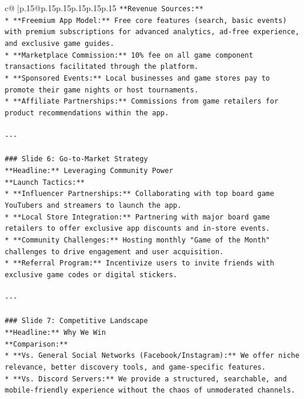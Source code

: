\documentclass{article}
\begin{document}
{\begin{supertabular}{c@{$\;$}|p{.15\linewidth}@{}p{.15\linewidth}p{.15\linewidth}p{.15\linewidth}p{.15\linewidth}p{.15\linewidth}}
{{{\texttt{**Revenue Sources:**} \\
\texttt{*   **Freemium App Model:** Free core features (search, basic events) with premium subscriptions for advanced analytics, ad{-}free experience, and exclusive game guides.} \\
\texttt{*   **Marketplace Commission:** 10\% fee on all game component transactions facilitated through the platform.} \\
\texttt{*   **Sponsored Events:** Local businesses and game stores pay to promote their game nights or host tournaments.} \\
\texttt{*   **Affiliate Partnerships:** Commissions from game retailers for product recommendations within the app.} \\
\\ 
\texttt{{-}{-}{-}} \\
\\ 
\texttt{\#\#\# Slide 6: Go{-}to{-}Market Strategy} \\
\texttt{**Headline:** Leveraging Community Power} \\
\texttt{**Launch Tactics:**} \\
\texttt{*   **Influencer Partnerships:** Collaborating with top board game YouTubers and streamers to launch the app.} \\
\texttt{*   **Local Store Integration:** Partnering with major board game retailers to offer exclusive app discounts and in{-}store events.} \\
\texttt{*   **Community Challenges:** Hosting monthly "Game of the Month" challenges to drive engagement and user acquisition.} \\
\texttt{*   **Referral Program:** Incentivize users to invite friends with exclusive game codes or digital stickers.} \\
\\ 
\texttt{{-}{-}{-}} \\
\\ 
\texttt{\#\#\# Slide 7: Competitive Landscape} \\
\texttt{**Headline:** Why We Win} \\
\texttt{**Comparison:**} \\
\texttt{*   **Vs. General Social Networks (Facebook/Instagram):** We offer niche relevance, better discovery tools, and game{-}specific features.} \\
\texttt{*   **Vs. Discord Servers:** We provide a structured, searchable, and mobile{-}friendly experience without the chaos of unmoderated channels.} \\
}}}
\end{supertabular}}
\end{document}
